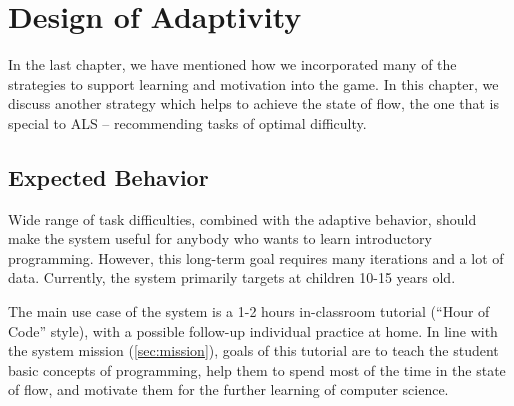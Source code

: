 \chapter{Design of Adaptivity}
\label{chap:design-of-adaptivity}

In the last chapter, we have mentioned how we incorporated many of the
strategies to support learning and motivation into the game.
In this chapter, we discuss another strategy which helps to achieve the state of
flow, the one that is special to ALS  %
-- recommending tasks of optimal difficulty.

\section{Expected Behavior}  %
\label{sec:robomission.behavior}



Wide range of task difficulties, combined with the adaptive behavior,
should make the system useful for anybody who wants to learn
introductory programming.
However, this long-term goal requires many iterations and a lot of data.
Currently, the system primarily targets at children 10-15 years old.

The main use case of the system is a 1-2 hours in-classroom tutorial
(``Hour of Code'' style), with a possible follow-up individual practice at home.
In line with the system mission (\cref{sec:mission}), goals of this tutorial
are to teach the student basic concepts of programming,
help them to spend most of the time in the state of flow,
and motivate them for the further learning of computer science.

